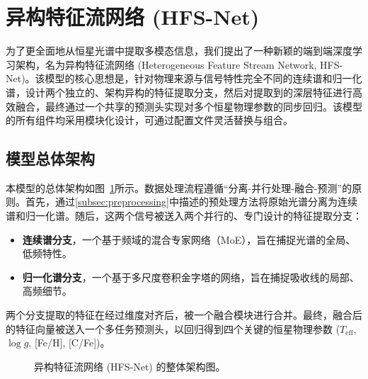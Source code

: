 \section{异构特征流网络 (HFS-Net)}
\label{sec:hfs_net_architecture}

为了更全面地从恒星光谱中提取多模态信息，我们提出了一种新颖的端到端深度学习架构，名为异构特征流网络 (Heterogeneous Feature Stream Network, HFS-Net)。该模型的核心思想是，针对物理来源与信号特性完全不同的连续谱和归一化谱，设计两个独立的、架构异构的特征提取分支，然后对提取到的深层特征进行高效融合，最终通过一个共享的预测头实现对多个恒星物理参数的同步回归。该模型的所有组件均采用模块化设计，可通过配置文件灵活替换与组合。

\subsection{模型总体架构}
\label{subsec:hfs_net_overview}

本模型的总体架构如图~\ref{fig:hfs_net_diagram}所示。数据处理流程遵循“分离-并行处理-融合-预测”的原则。首先，通过\ref{subsec:preprocessing}中描述的预处理方法将原始光谱分离为连续谱和归一化谱。随后，这两个信号被送入两个并行的、专门设计的特征提取分支：

\begin{itemize}
    \item \textbf{连续谱分支}，一个基于频域的混合专家网络（MoE），旨在捕捉光谱的全局、低频特性。
    \item \textbf{归一化谱分支}，一个基于多尺度卷积金字塔的网络，旨在捕捉吸收线的局部、高频细节。
\end{itemize}

两个分支提取的特征在经过维度对齐后，被一个融合模块进行合并。最终，融合后的特征向量被送入一个多任务预测头，以回归得到四个关键的恒星物理参数 ($T_{\text{eff}}$, $\log g$, [Fe/H], [C/Fe])。

\begin{figure}[h!]
    \centering
    \caption{异构特征流网络 (HFS-Net) 的整体架构图。}
    \label{fig:hfs_net_diagram}
\end{figure}

